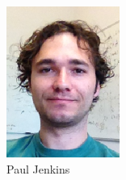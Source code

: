 \documentclass[aspectratio=169]{beamer}
\begin{document}
\begin{frame}
\begin{columns}
\begin{column}{0.2\textwidth}
\includegraphics[width=\textwidth]{paul.png}\\
Paul Jenkins
\end{column}
\end{columns}
\end{frame}

\begin{frame}
\end{frame}
\end{document}
